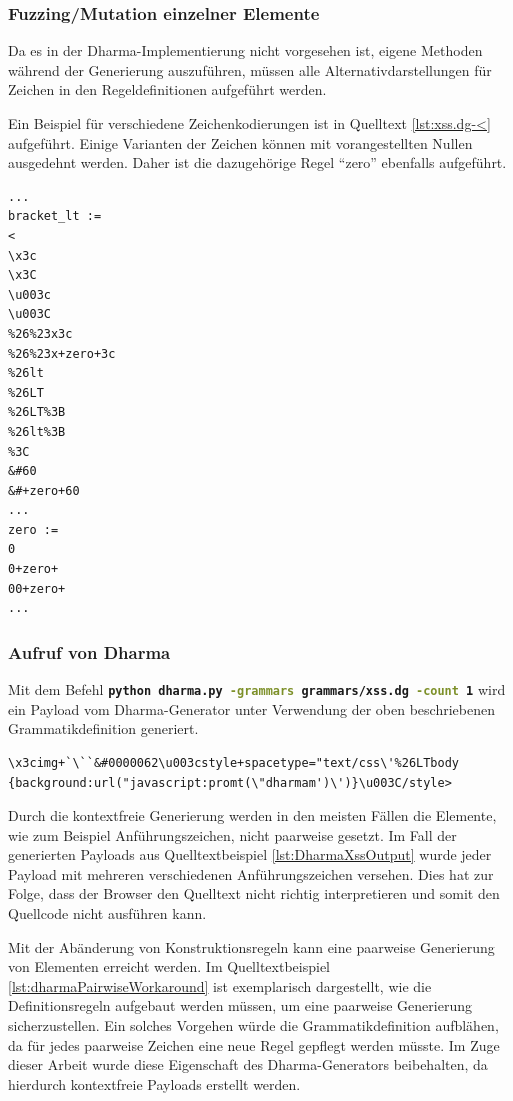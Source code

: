 \subsubsection{Fuzzing/Mutation einzelner Elemente}

Da es in der Dharma-Implementierung nicht vorgesehen ist, eigene Methoden während der Generierung auszuführen, müssen alle Alternativdarstellungen für Zeichen in den Regeldefinitionen aufgeführt werden.

Ein Beispiel für verschiedene Zeichenkodierungen ist in Quelltext \ref{lst:xss.dg-<} aufgeführt. Einige Varianten der Zeichen können mit vorangestellten Nullen ausgedehnt werden. Daher ist die dazugehörige Regel ``zero'' ebenfalls aufgeführt.

\begin{lstlisting}[caption={Dharma: Regeldefinition des Zeichens ``<''},label=lst:xss.dg-<]
...
bracket_lt :=
<
\x3c
\x3C
\u003c
\u003C
%26%23x3c
%26%23x+zero+3c
%26lt
%26LT
%26LT%3B
%26lt%3B
%3C
&#60
&#+zero+60
...
zero :=
0
0+zero+
00+zero+
...
\end{lstlisting}


\subsubsection{Aufruf von Dharma}

Mit dem Befehl \textbf{\lstinline[language=bash]!python dharma.py -grammars grammars/xss.dg -count 1!} wird ein Payload vom Dharma-Generator unter Verwendung der oben beschriebenen Grammatikdefinition generiert. 

\begin{lstlisting}[caption={Dharma: Beispiel für einen generierten Payload},label=lst:DharmaXssOutput] 
\x3cimg+`\``&#0000062\u003cstyle+spacetype="text/css\'%26LTbody
{background:url("javascript:promt(\"dharmam')\')}\u003C/style>
\end{lstlisting}


Durch die kontextfreie Generierung werden in den meisten Fällen die Elemente, wie zum Beispiel Anführungszeichen, nicht paarweise gesetzt. Im Fall der generierten Payloads aus Quelltextbeispiel \ref{lst:DharmaXssOutput} wurde jeder Payload mit mehreren verschiedenen Anführungszeichen versehen. Dies hat zur Folge, dass der Browser den Quelltext nicht richtig interpretieren und somit den Quellcode nicht ausführen kann.

Mit der Abänderung von Konstruktionsregeln kann eine paarweise Generierung von Elementen erreicht werden. Im Quelltextbeispiel \ref{lst:dharmaPairwiseWorkaround} ist exemplarisch dargestellt, wie die Definitionsregeln aufgebaut werden müssen, um eine paarweise Generierung sicherzustellen. Ein solches Vorgehen würde die Grammatikdefinition aufblähen, da für jedes paarweise Zeichen eine neue Regel gepflegt werden müsste. Im Zuge dieser Arbeit wurde diese Eigenschaft des Dharma-Generators beibehalten, da hierdurch kontextfreie Payloads erstellt werden. 

